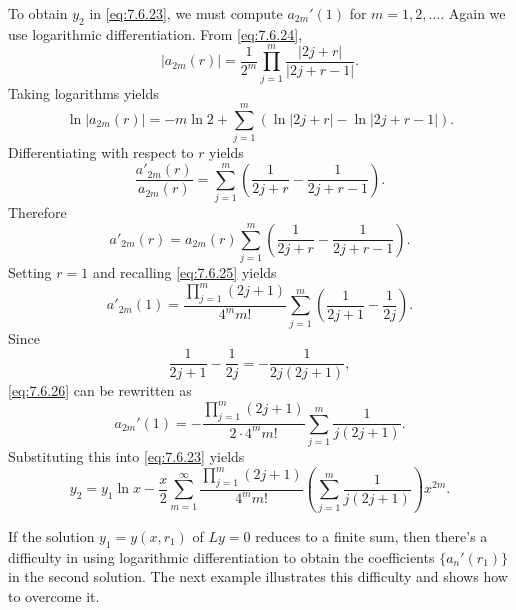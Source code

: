 \documentclass{ximera}
\begin{document}
\begin{example}
\begin{explanation}
To obtain $y_2$ in \eqref{eq:7.6.23}, we must compute $a_{2m}'(1)$
for $m=1, 2, \dots$. Again we use logarithmic differentiation. From
\eqref{eq:7.6.24},
$$
|a_{2m}(r)|=\frac{1}{2^m}\prod_{j=1}^m\frac{|2j+r|}{|2j+r-1|}.
$$
Taking logarithms yields
$$
\ln |a_{2m}(r)|=-m\ln2+ \sum^m_{j=1} \left(\ln
|2j+r|-\ln|2j+r-1|\right).
$$
Differentiating with respect to $r$ yields
$$
\frac{a'_{2m}(r)}{a_{2m}(r)}=\sum^m_{j=1} \left(\frac{1}{2j+r}-\frac{1}{2j+r-1}\right).
$$
Therefore
$$
a'_{2m}(r)=a_{2m}(r) \sum^m_{j=1} \left(\frac{1}{2j+r}-\frac{1}{2j+r-1}\right).
$$
Setting $r=1$  and recalling \eqref{eq:7.6.25} yields
\begin{equation} \label{eq:7.6.26}
a'_{2m}(1)=\frac{\prod_{j=1}^m(2j+1)}{4^mm!}
\sum_{j=1}^m\left(\frac{1}{2j+1}-\frac{1}{2j}\right).
\end{equation}
Since
$$
\frac{1}{2j+1}-\frac{1}{2j}=-\frac{1}{2j(2j+1)},
$$
\eqref{eq:7.6.26} can be rewritten as
$$
a_{2m}'(1)=-\frac{\prod_{j=1}^m(2j+1)}{2\cdot4^mm!}
\sum_{j=1}^m\frac{1}{j(2j+1)}.
$$
Substituting this into \eqref{eq:7.6.23} yields
$$
y_2=y_1\ln
x-\frac{x}{2}\sum_{m=1}^\infty\frac{\prod_{j=1}^m(2j+1)}{4^mm!}
\left(\sum_{j=1}^m\frac{1}{j(2j+1)}\right)x^{2m}.
$$
\end{explanation}
\end{example}

If the solution $y_1=y(x,r_1)$ of $Ly=0$ reduces to a finite sum, then
there's a
difficulty in using logarithmic differentiation to obtain the coefficients
$\{a_n'(r_1)\}$ in the second solution. The next example illustrates
this difficulty and shows how to overcome it.
\end{document}
